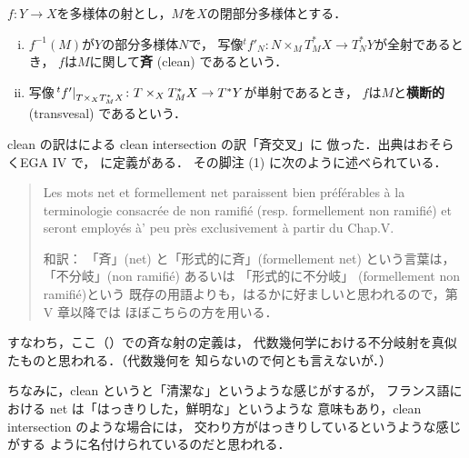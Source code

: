 \(f\colon Y\to X\)を多様体の射とし，\(M\)を\(X\)の閉部分多様体とする．

\begin{DFN}
    \begin{enumerate}[(i)]
        \item  \(f^{-1}(M)\)が\(Y\)の部分多様体\(N\)で，
        写像\(
            {}^{t}f'_{N}\colon 
            N\times_{M}T^{\ast}_{M}X\to T^{\ast}_{N}Y
        \)が全射であるとき，
        \(f\)は\(M\)に関して\textbf{斉} (clean) であるという．
        \item  写像\(
            \mres[{}^{t}f']{T\times_{X}T^{\ast}_{M}X}\colon 
            T\times_{X}T^{\ast}_{M}X\to T^{\ast}Y
        \)が単射であるとき，
        \(f\)は\(M\)と\textbf{横断的} (transvesal) であるという．
    \end{enumerate}
\end{DFN}

\begin{CMT}
    clean の訳は\cite{Fuk99}による clean intersection の訳「斉交叉」に
    倣った．出典はおそらくEGA IV で，
    \cite[Def.17.3.1]{EGA IV}に定義がある．
    その脚注 (1) に次のように述べられている．
    \begin{quote}
        Les mots net et formellement net paraissent 
        bien pr\'ef\'erables \`a la terminologie 
        consacr\'ee de non ramifi\'e (resp. formellement 
        non ramifi\'e) et seront employ\'es \`a' 
        peu pr\`es exclusivement \`a partir du Chap.V.

        和訳：
        「斉」(net) と「形式的に斉」(formellement net) という言葉は，
        「不分岐」(non ramifi\'e) あるいは
        「形式的に不分岐」 (formellement non ramifi\'e)という
        既存の用語よりも，はるかに好ましいと思われるので，第 V 章以降では
        ほぼこちらの方を用いる．
    \end{quote}
    すなわち，ここ（\cite{KS90}）での斉な射の定義は，
    代数幾何学における不分岐射を真似たものと思われる．（代数幾何を
    知らないので何とも言えないが．）

    ちなみに，clean というと「清潔な」というような感じがするが，
    フランス語における net は「はっきりした，鮮明な」というような
    意味もあり，clean intersection のような場合には，
    交わり方がはっきりしているというような感じがする
    ように名付けられているのだと思われる．
\end{CMT}

